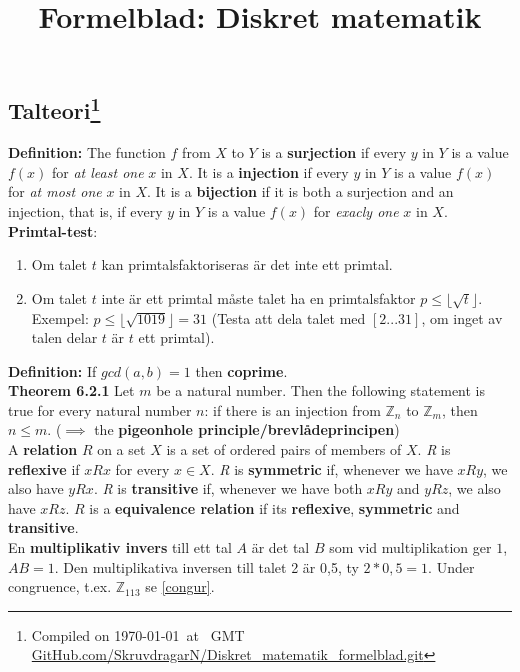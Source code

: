\documentclass{article}
\title{Formelblad: Diskret matematik}
\begin{document}
\begin{multicols}{2}
\section{Talteori\footnote{Compiled on \today\ at \currenttime \ GMT\\\href{https://github.com/SkruvdragarN/Diskret_matematik_formelblad}{\url{GitHub.com/SkruvdragarN/Diskret_matematik_formelblad.git}}}}
\textbf{Definition:} The function $f$ from $X$ to $Y$ is a \textbf{surjection} if every $y$ in $Y$ is a value $f(x)$ for \textit{at least one} $x$ in $X$. It is a \textbf{injection} if every $y$ in $Y$ is a value $f(x)$ for \textit{at most one} $x$ in $X$. It is a \textbf{bijection} if it is both a surjection and an injection, that is, if every $y$ in $Y$ is a value $f(x)$ for \textit{exacly one} $x$ in $X$.\\
\newline
\textbf{Primtal-test}:
\begin{enumerate}
    \item Om talet $t$ kan primtalsfaktoriseras är det inte ett primtal.
    \item Om talet $t$ inte är ett primtal måste talet ha en primtalsfaktor $p \leq \lfloor \sqrt{t} \rfloor$. Exempel: $p \leq \lfloor \sqrt{1019} \rfloor = 31$ (Testa att dela talet med $[2... 31]$, om inget av talen delar $t$ är $t$ ett primtal).
\end{enumerate}
\newline
\textbf{Definition:} If $gcd(a,b) = 1$ then \textbf{coprime}.\\
\newline
\textbf{Theorem 6.2.1}
Let $m$ be a natural number. Then the following statement is true for every natural number $n$: if there is an injection from $\mathbb{Z}_n$ to $\mathbb{Z}_m$, then $n\leq m$. ($\implies$ the \textbf{pigeonhole principle/brevlådeprincipen})\\
\newline
A \textbf{relation} $R$ on a set $X$ is a set of ordered pairs of members of $X$. \textit{R} is \textbf{reflexive} if $xRx$ for every $x \in X$. \textit{R} is \textbf{symmetric} if, whenever we have $xRy$, we also have $yRx$. \textit{R} is \textbf{transitive} if, whenever we have both $xRy$ and $yRz$, we also have $xRz$. $R$ is a \textbf{equivalence relation} if its \textbf{reflexive}, \textbf{symmetric} and \textbf{transitive}.\\
\newline
En \textbf{multiplikativ invers} till ett tal $A$ är det tal $B$ som vid multiplikation ger $1$, $AB=1$. Den multiplikativa inversen till talet 2 är 0,5, ty $2*0,5=1$. Under congruence, t.ex. $\mathbb{Z}_{113}$ se \ref{congur}.



\end{multicols}
\end{document}
